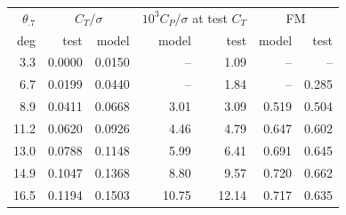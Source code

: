 \begin{tabular}{@{}rrrrrrr@{}}
\toprule
$\theta_{.7}$ & \multicolumn{2}{c}{$C_T/\sigma$} & \multicolumn{2}{c}{$10^3 C_P/\sigma$ at test $C_T$} & \multicolumn{2}{c}{FM} \\
 deg & test & model & model & test & model & test \\
\midrule
3.3 & 0.0000 & 0.0150 & -- & 1.09 & -- & -- \\
6.7 & 0.0199 & 0.0440 & -- & 1.84 & -- & 0.285 \\
8.9 & 0.0411 & 0.0668 & 3.01 & 3.09 & 0.519 & 0.504 \\
11.2 & 0.0620 & 0.0926 & 4.46 & 4.79 & 0.647 & 0.602 \\
13.0 & 0.0788 & 0.1148 & 5.99 & 6.41 & 0.691 & 0.645 \\
14.9 & 0.1047 & 0.1368 & 8.80 & 9.57 & 0.720 & 0.662 \\
16.5 & 0.1194 & 0.1503 & 10.75 & 12.14 & 0.717 & 0.635 \\
\bottomrule
\end{tabular}
